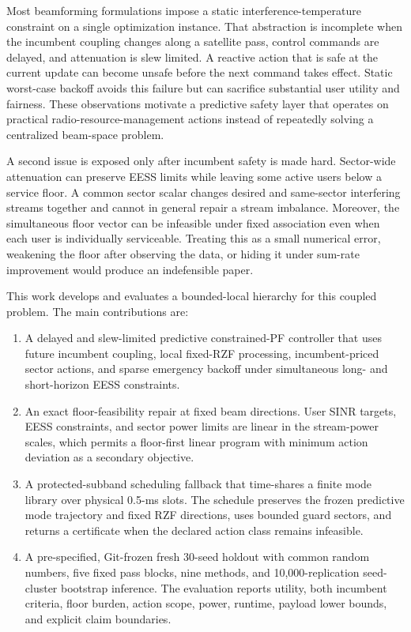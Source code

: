 \documentclass[journal]{IEEEtran}
\begin{document}
Most beamforming formulations impose a static interference-temperature constraint on a single optimization instance. That abstraction is incomplete when the incumbent coupling changes along a satellite pass, control commands are delayed, and attenuation is slew limited. A reactive action that is safe at the current update can become unsafe before the next command takes effect. Static worst-case backoff avoids this failure but can sacrifice substantial user utility and fairness. These observations motivate a predictive safety layer that operates on practical radio-resource-management actions instead of repeatedly solving a centralized beam-space problem.

A second issue is exposed only after incumbent safety is made hard. Sector-wide attenuation can preserve EESS limits while leaving some active users below a service floor. A common sector scalar changes desired and same-sector interfering streams together and cannot in general repair a stream imbalance. Moreover, the simultaneous floor vector can be infeasible under fixed association even when each user is individually serviceable. Treating this as a small numerical error, weakening the floor after observing the data, or hiding it under sum-rate improvement would produce an indefensible paper.

This work develops and evaluates a bounded-local hierarchy for this coupled problem. The main contributions are:
\begin{enumerate}
\item A delayed and slew-limited predictive constrained-PF controller that uses future incumbent coupling, local fixed-RZF processing, incumbent-priced sector actions, and sparse emergency backoff under simultaneous long- and short-horizon EESS constraints.
\item An exact floor-feasibility repair at fixed beam directions. User SINR targets, EESS constraints, and sector power limits are linear in the stream-power scales, which permits a floor-first linear program with minimum action deviation as a secondary objective.
\item A protected-subband scheduling fallback that time-shares a finite mode library over physical 0.5-ms slots. The schedule preserves the frozen predictive mode trajectory and fixed RZF directions, uses bounded guard sectors, and returns a certificate when the declared action class remains infeasible.
\item A pre-specified, Git-frozen fresh 30-seed holdout with common random numbers, five fixed pass blocks, nine methods, and 10,000-replication seed-cluster bootstrap inference. The evaluation reports utility, both incumbent criteria, floor burden, action scope, power, runtime, payload lower bounds, and explicit claim boundaries.
\end{enumerate}
\end{document}
